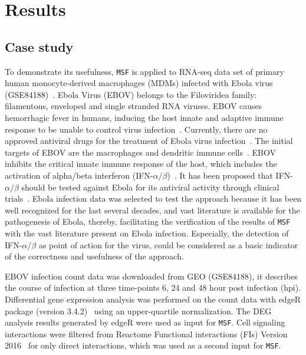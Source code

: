 \documentclass[10pt,a4paper,twocolumn]{article}
\begin{document}
	
	\section*{Results}
	
	\subsection*{Case study}
	
	To demonstrate its usefulness, \texttt{MSF} is applied to RNA-seq data
	set of primary human monocyte-derived macrophages (MDMs) infected with
	Ebola virus (GSE84188)~\cite{Olejnik}. Ebola Virus (EBOV) belongs to the Filoviridea family: filamentous, enveloped and single stranded RNA
	viruses. EBOV causes hemorrhagic fever in humans, inducing the host innate
	and adaptive immune response to be unable to control virus
	infection~\cite{Prins}. Currently, there are no approved antiviral drugs
	for the treatment of Ebola virus infection~\cite{Konde,Rhein}.  The initial
	targets of EBOV are the macrophages and dendritic immune
	cells~\cite{Falasca,Rhein}. EBOV inhibits the critical innate immune
	response of the host, which includes the activation of alpha/beta
	interferon (IFN-$\alpha / \beta$)~\cite{Prins,Konde,Cardenas}. It has been
	proposed that IFN-$\alpha / \beta$ should be tested against Ebola for its
	antiviral activity through clinical trials~\cite{Konde}. Ebola infection
	data was selected to test the approach because it has been well recognized for the last several decades, and vast literature is available for the pathogenesis of Ebola, thereby, facilitating the verification of the results of
	\texttt{MSF} with the vast literature present on Ebola
	infection. Especially, the detection of IFN-$\alpha / \beta$ as point of
	action for the virus, could be considered as a basic indicator of the
	correctness and usefulness of the approach.
	
	EBOV infection count data was downloaded from GEO (GSE84188), it describes the course of infection at three
	time-points 6, 24 and 48 hour post infection (hpi). Differential
	gene expression analysis was performed on the count data with edgeR package
	(version 3.4.2)~\cite{edgeR} using an upper-quartile normalization. The DEG analysis results generated by edgeR
	were used as input for \texttt{MSF}. Cell signaling interactions
	were filtered from Reactome Functional interactions (FIs) Version
	2016~\cite{Cytokegg} for only direct interactions, which was used as a second input for \texttt{MSF}.
	
\end{document}

